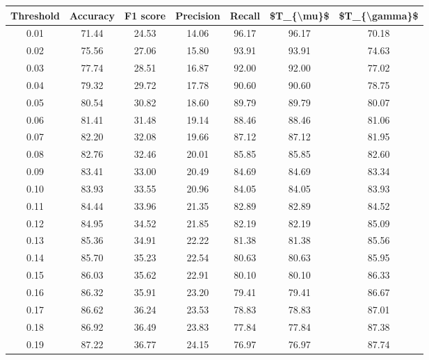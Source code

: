 \begin{tabular}{|c|c|c|c|c|c|c|}
\toprule
 Threshold &  Accuracy &  F1 score &  Precision &  Recall &  \$T\_\{\textbackslash mu\}\$ &  \$T\_\{\textbackslash gamma\}\$ \\
\hline
      0.01 &     71.44 &     24.53 &      14.06 &   96.17 &      96.17 &         70.18 \\
      0.02 &     75.56 &     27.06 &      15.80 &   93.91 &      93.91 &         74.63 \\
      0.03 &     77.74 &     28.51 &      16.87 &   92.00 &      92.00 &         77.02 \\
      0.04 &     79.32 &     29.72 &      17.78 &   90.60 &      90.60 &         78.75 \\
      0.05 &     80.54 &     30.82 &      18.60 &   89.79 &      89.79 &         80.07 \\
      0.06 &     81.41 &     31.48 &      19.14 &   88.46 &      88.46 &         81.06 \\
      0.07 &     82.20 &     32.08 &      19.66 &   87.12 &      87.12 &         81.95 \\
      0.08 &     82.76 &     32.46 &      20.01 &   85.85 &      85.85 &         82.60 \\
      0.09 &     83.41 &     33.00 &      20.49 &   84.69 &      84.69 &         83.34 \\
      0.10 &     83.93 &     33.55 &      20.96 &   84.05 &      84.05 &         83.93 \\
      0.11 &     84.44 &     33.96 &      21.35 &   82.89 &      82.89 &         84.52 \\
      0.12 &     84.95 &     34.52 &      21.85 &   82.19 &      82.19 &         85.09 \\
      0.13 &     85.36 &     34.91 &      22.22 &   81.38 &      81.38 &         85.56 \\
      0.14 &     85.70 &     35.23 &      22.54 &   80.63 &      80.63 &         85.95 \\
      0.15 &     86.03 &     35.62 &      22.91 &   80.10 &      80.10 &         86.33 \\
      0.16 &     86.32 &     35.91 &      23.20 &   79.41 &      79.41 &         86.67 \\
      0.17 &     86.62 &     36.24 &      23.53 &   78.83 &      78.83 &         87.01 \\
      0.18 &     86.92 &     36.49 &      23.83 &   77.84 &      77.84 &         87.38 \\
      0.19 &     87.22 &     36.77 &      24.15 &   76.97 &      76.97 &         87.74 \\

\end{tabular}
